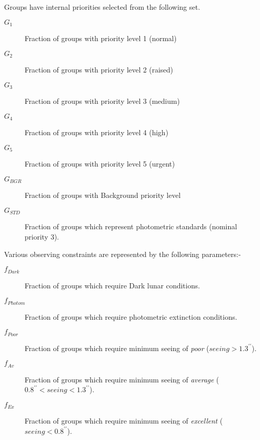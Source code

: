 Groups have internal priorities selected from the following set.
\begin{description}
\item [$G_1$] Fraction of groups with priority level 1 (normal)
\item [$G_2$] Fraction of groups with priority level 2 (raised)
\item [$G_3$] Fraction of groups with priority level 3 (medium)
\item [$G_4$] Fraction of groups with priority level 4 (high)
\item [$G_5$] Fraction of groups with priority level 5 (urgent)
\item [$G_{BGR}$] Fraction of groups with Background priority level
\item [$G_{STD}$] Fraction of groups which represent photometric standards (nominal priority 3).
\end{description}

Various observing constraints are represented by the following parameters:-
\begin{description}
\item [$f_{Dark}$] Fraction of groups which require Dark lunar conditions.
\item [$f_{Photom}$] Fraction of groups which require photometric extinction conditions.
\item [$f_{Poor}$] Fraction of groups which require minimum seeing of \emph{poor} ($ seeing > 1.3^{\prime\prime}$).
\item [$f_{Av}$] Fraction of groups which require minimum seeing of \emph{average} ($ 0.8^{\prime\prime} < seeing < 1.3^{\prime\prime} $).
\item [$f_{Ex}$] Fraction of groups which require minimum seeing of \emph{excellent} ($ seeing < 0.8^{\prime\prime}$).
\end{description}


 
 

